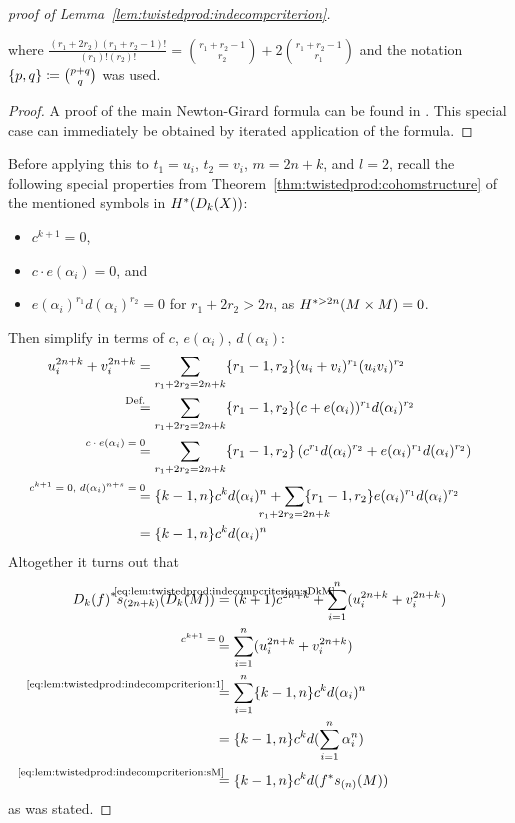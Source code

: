 \begin{proof}[proof of Lemma~\ref{lem:twistedprod:indecompcriterion}]
\begin{Lem}
    where $\frac{(r_1+2r_2)(r_1+r_2-1)!}{(r_1)!(r_2)!}
    = \binom{r_1+r_2-1}{r_2} + 2\binom{r_1+r_2-1}{r_1}$
    and the notation $\{p,q\}\coloneqq \binom{p+q}{q}$
    was used.
    \begin{proof}
      A proof of the main Newton-Girard formula can be found in
      \cite[Theorem~10.12.2]{raymond}. This special case can
      immediately be obtained by iterated application of the formula.
    \end{proof}
  \end{Lem}
  Before applying this to $t_1=u_i$, $t_2=v_i$, $m=2n+k$, and $l=2$,
  recall the following special properties from
  Theorem~\ref{thm:twistedprod:cohomstructure} of the mentioned symbols in
  $H^*(D_{k}({X}))$:
  \begin{itemize}
  \item $c^{k+1}=0$,
  \item $c\cdot e(\alpha_i)=0$, and
  \item $e(\alpha_i)^{r_1}d(\alpha_i)^{r_2} = 0$ for $r_1+2r_2>2n$,
    as $H^{*>2n}(M\times M)=0$.
  \end{itemize}
  Then simplify in terms of $c$, $e(\alpha_i)$, $d(\alpha_i)$:
  \begin{align}\notag
    u_i^{2n+k} + v_i^{2n+k}
    &=
      \sum_{{r_1+2r_2=2n+k}}
      \altbinom{r_1-1}{r_2} (u_i+v_i)^{r_1}(u_iv_i)^{r_2} \\\notag
    &\equalsby{Def.}
      \sum_{{r_1+2r_2=2n+k}}
      \altbinom{r_1-1}{r_2}
      (c+e(\alpha_i))^{r_1}d(\alpha_i)^{r_2} \\\notag
    &\equalsby{$c\cdot e(\alpha_i)=0$}
      \sum_{{r_1+2r_2=2n+k}} \altbinom{r_1-1}{r_2}
      \left(c^{r_1}d(\alpha_i)^{r_2}+e(\alpha_i)^{r_1}d(\alpha_i)^{r_2}\right) \\\notag
    &\equalsby{$c^{k+1}=0$, $d(\alpha_i)^{n+s}=0$}
      \altbinom{k-1}{n} c^k d(\alpha_i)^n
      + \sum_{\mathclap{r_1+2r_2=2n+k}} \altbinom{r_1-1}{r_2}
      e(\alpha_i)^{r_1}d(\alpha_i)^{r_2} \\
    \label{eq:lem:twistedprod:indecompcriterion:1}
    &= \altbinom{k-1}{n} c^k d(\alpha_i)^n      
  \end{align}
  Altogether it turns out that
  \begin{align*}
    \pb{\Twistedprod{k}{f}}\s{(2n+k)}(\Twistedprod{k}{M})
    &\cequalsby{\eqref{eq:lem:twistedprod:indecompcriterion:sDkM}}
      (k+1)c^{2n+k} + \sum_{i=1}^n (u_i^{2n+k} + v_i^{2n+k}) \\
    &\equalsby{$c^{k+1}=0$}
      \sum_{i=1}^n (u_i^{2n+k} + v_i^{2n+k}) \\
    &\equalsby{\eqref{eq:lem:twistedprod:indecompcriterion:1}}
      \sum_{i=1}^n \altbinom{k-1}{n} c^k d(\alpha_i)^n \\
    &= \altbinom{k-1}{n} c^k d(\sum_{i=1}^n \alpha_i^n) \\
    &\equalsby{\eqref{eq:lem:twistedprod:indecompcriterion:sM}}
      \altbinom{k-1}{n} c^k d(\pb f \s{(n)}(M))
  \end{align*}
  as was stated.
\end{proof}

